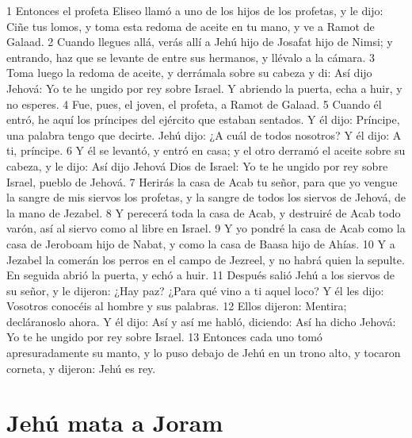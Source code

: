 1 Entonces el profeta Eliseo llamó a uno de los hijos de los profetas, y le dijo: Ciñe tus lomos, y toma esta redoma de aceite en tu mano, y ve a Ramot de Galaad.
2 Cuando llegues allá, verás allí a Jehú hijo de Josafat hijo de Nimsi; y entrando, haz que se levante de entre sus hermanos, y llévalo a la cámara.
3 Toma luego la redoma de aceite, y derrámala sobre su cabeza y di: Así dijo Jehová: Yo te he ungido por rey sobre Israel. Y abriendo la puerta, echa a huir, y no esperes.
4 Fue, pues, el joven, el profeta, a Ramot de Galaad.
5 Cuando él entró, he aquí los príncipes del ejército que estaban sentados. Y él dijo: Príncipe, una palabra tengo que decirte. Jehú dijo: ¿A cuál de todos nosotros? Y él dijo: A ti, príncipe.
6 Y él se levantó, y entró en casa; y el otro derramó el aceite sobre su cabeza, y le dijo: Así dijo Jehová Dios de Israel: Yo te he ungido por rey sobre Israel, pueblo de Jehová. 
7 Herirás la casa de Acab tu señor, para que yo vengue la sangre de mis siervos los profetas, y la sangre de todos los siervos de Jehová, de la mano de Jezabel.
8 Y perecerá toda la casa de Acab, y destruiré de Acab todo varón, así al siervo como al libre en Israel.
9 Y yo pondré la casa de Acab como la casa de Jeroboam hijo de Nabat, y como la casa de Baasa hijo de Ahías.
10 Y a Jezabel la comerán los perros en el campo de Jezreel, y no habrá quien la sepulte. En seguida abrió la puerta, y echó a huir.
11 Después salió Jehú a los siervos de su señor, y le dijeron: ¿Hay paz? ¿Para qué vino a ti aquel loco? Y él les dijo: Vosotros conocéis al hombre y sus palabras.
12 Ellos dijeron: Mentira; decláranoslo ahora. Y él dijo: Así y así me habló, diciendo: Así ha dicho Jehová: Yo te he ungido por rey sobre Israel.
13 Entonces cada uno tomó apresuradamente su manto, y lo puso debajo de Jehú en un trono alto, y tocaron corneta, y dijeron: Jehú es rey.

\section*{Jehú mata a Joram}


